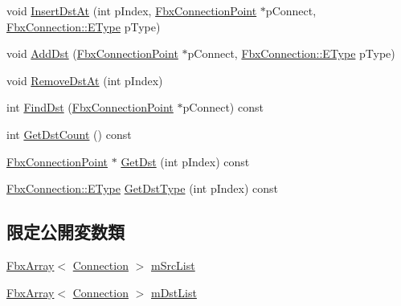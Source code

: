 \begin{DoxyCompactItemize}
void \hyperlink{class_fbx_connection_point_1_1_connection_list_aece98d3543f0a3cdc2d5255abf6b1225}{Insert\+Dst\+At} (int p\+Index, \hyperlink{class_fbx_connection_point}{Fbx\+Connection\+Point} $\ast$p\+Connect, \hyperlink{class_fbx_connection_a3df448a5db356652ab99fd2be2553749}{Fbx\+Connection\+::\+E\+Type} p\+Type)
\item 
void \hyperlink{class_fbx_connection_point_1_1_connection_list_a8e1af14c978ff09c8b36df941edf07db}{Add\+Dst} (\hyperlink{class_fbx_connection_point}{Fbx\+Connection\+Point} $\ast$p\+Connect, \hyperlink{class_fbx_connection_a3df448a5db356652ab99fd2be2553749}{Fbx\+Connection\+::\+E\+Type} p\+Type)
\item 
void \hyperlink{class_fbx_connection_point_1_1_connection_list_aa64b434b7d06a75a7e91cc2eb060480a}{Remove\+Dst\+At} (int p\+Index)
\item 
int \hyperlink{class_fbx_connection_point_1_1_connection_list_ad69e4e361c1208dd3578a7c6d668c72e}{Find\+Dst} (\hyperlink{class_fbx_connection_point}{Fbx\+Connection\+Point} $\ast$p\+Connect) const
\item 
int \hyperlink{class_fbx_connection_point_1_1_connection_list_a023c16496781e4598b5d00ffddedc06e}{Get\+Dst\+Count} () const
\item 
\hyperlink{class_fbx_connection_point}{Fbx\+Connection\+Point} $\ast$ \hyperlink{class_fbx_connection_point_1_1_connection_list_adfade85543357e9f6a24125114f1e435}{Get\+Dst} (int p\+Index) const
\item 
\hyperlink{class_fbx_connection_a3df448a5db356652ab99fd2be2553749}{Fbx\+Connection\+::\+E\+Type} \hyperlink{class_fbx_connection_point_1_1_connection_list_a257fb5ca1037987056d79abd1f9d08b2}{Get\+Dst\+Type} (int p\+Index) const
\end{DoxyCompactItemize}
\subsection*{限定公開変数類}
\begin{DoxyCompactItemize}
\item 
\hyperlink{class_fbx_array}{Fbx\+Array}$<$ \hyperlink{struct_fbx_connection_point_1_1_connection_list_1_1_connection}{Connection} $>$ \hyperlink{class_fbx_connection_point_1_1_connection_list_a9eb70c4ab758d092ca447956c37d1d20}{m\+Src\+List}
\item 
\hyperlink{class_fbx_array}{Fbx\+Array}$<$ \hyperlink{struct_fbx_connection_point_1_1_connection_list_1_1_connection}{Connection} $>$ \hyperlink{class_fbx_connection_point_1_1_connection_list_a8ac3c6f72ba91b17f651159a87670db3}{m\+Dst\+List}
\end{DoxyCompactItemize}


